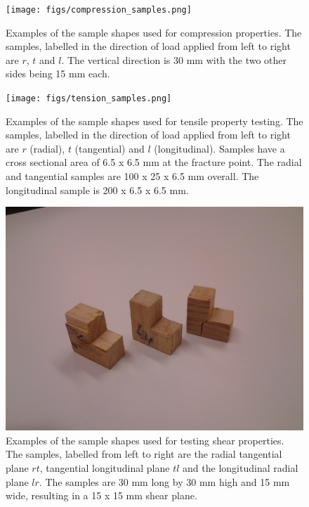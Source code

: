 \documentclass[10pt]{article}
\begin{document}
\begin{figure}[!ht]
\begin{center}
\texttt{[image: figs/compression\_samples.png]}
\caption[Compression samples]{\label{fig:compression_samples} Examples of the sample shapes used for compression properties. The samples, labelled in the direction of load applied from left to right are \(r\), \(t\) and \(l\). The vertical direction is 30 mm with the two other sides being 15 mm each.
}
\end{center}
\end{figure}

\begin{figure}[!ht]
\begin{center}
\texttt{[image: figs/tension\_samples.png]}
\caption[Tension samples]{\label{fig:tension_samples} Examples of the sample shapes used for tensile property testing. The samples, labelled in the direction of load applied from left to right are \(r\) (radial), \(t\) (tangential) and \(l\) (longitudinal). Samples have a cross sectional area of 6.5 x 6.5 mm at the fracture point. The radial and tangential samples are 100 x 25 x 6.5 mm overall. The longitudinal sample is 200 x 6.5 x 6.5 mm.
}
\end{center}
\end{figure}

\begin{figure}[!ht]
\begin{center}
\includegraphics[width=0.7\columnwidth]{figs/shear_samples.jpg}
\caption[Shear samples]{\label{fig:shear_samples} Examples of the sample shapes used for testing shear properties. The samples, labelled from left to right are the radial tangential plane \(rt\), tangential longitudinal plane \(tl\) and the longitudinal radial plane \(lr\). The samples are 30 mm long by 30 mm high and 15 mm wide, resulting in a 15 x 15 mm shear plane.
}
\end{center}
\end{figure}
\end{document}
